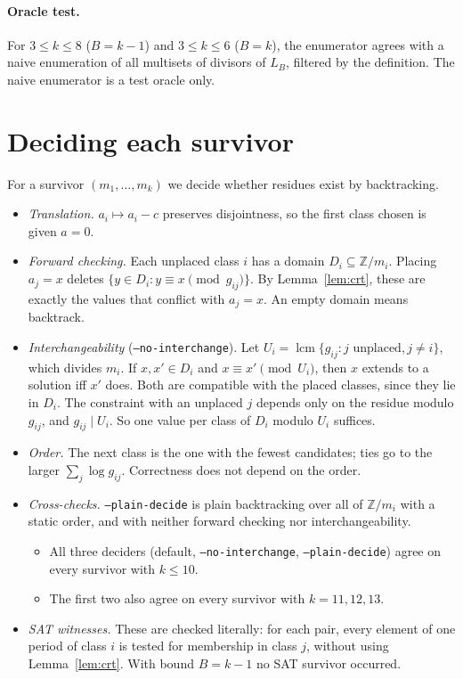 \documentclass[11pt]{article}
\theoremstyle{definition}
\theoremstyle{remark}
\begin{document}
\paragraph{Oracle test.}
For $3\le k\le8$ ($B=k-1$) and $3\le k\le6$ ($B=k$), the enumerator agrees with a naive
enumeration of all multisets of divisors of $L_B$, filtered by the definition. The naive
enumerator is a test oracle only.

\section{Deciding each survivor}\label{sec:dec}

For a survivor $(m_1,\dots,m_k)$ we decide whether residues exist by backtracking.
\begin{itemize}
\item \emph{Translation.} $a_i\mapsto a_i-c$ preserves disjointness, so the first class chosen is
  given $a=0$.
\item \emph{Forward checking.} Each unplaced class $i$ has a domain $D_i\subseteq\mathbb{Z}/m_i$.
  Placing $a_j=x$ deletes $\{y\in D_i: y\equiv x\pmod{g_{ij}}\}$. By Lemma~\ref{lem:crt}, these
  are exactly the values that conflict with $a_j=x$. An empty domain means backtrack.
\item \emph{Interchangeability} (\texttt{--no-interchange}). Let $U_i=\operatorname{lcm}\{g_{ij}: j\text{ unplaced}, j\ne i\}$,
  which divides $m_i$. If $x,x'\in D_i$ and $x\equiv x'\pmod{U_i}$, then $x$ extends to a solution
  iff $x'$ does. Both are compatible with the placed classes, since they lie in $D_i$. The
  constraint with an unplaced $j$ depends only on the residue modulo $g_{ij}$, and $g_{ij}\mid U_i$.
  So one value per class of $D_i$ modulo $U_i$ suffices.
\item \emph{Order.} The next class is the one with the fewest candidates; ties go to the larger
  $\sum_j\log g_{ij}$. Correctness does not depend on the order.
\item \emph{Cross-checks.} \texttt{--plain-decide} is plain backtracking over all of
  $\mathbb{Z}/m_i$ with a static order, and with neither forward checking nor
  interchangeability.
  \begin{itemize}
  \item All three deciders (default, \texttt{--no-interchange}, \texttt{--plain-decide}) agree
    on every survivor with $k\le10$.
  \item The first two also agree on every survivor with $k=11,12,13$.
  \end{itemize}
\item \emph{SAT witnesses.} These are checked literally: for each pair, every element of one
  period of class $i$ is tested for membership in class $j$, without using Lemma~\ref{lem:crt}.
  With bound $B=k-1$ no SAT survivor occurred.
\end{itemize}
\end{document}
